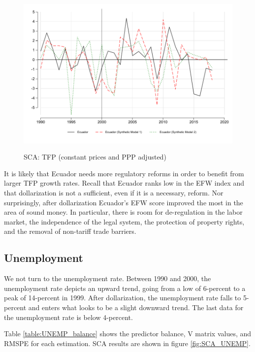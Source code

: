 \documentclass[12pt]{article}
\begin{document}


\begin{figure}[!htbp]
    \caption{SCA: TFP (constant prices and PPP adjusted)}
    \centering
    \includegraphics{STATA/Fig_TFP3_SCA.pdf}
    \label{fig:SCA_TFP}
\end{figure}

It is likely that Ecuador needs more regulatory reforms in order to benefit from larger TFP growth rates. Recall that Ecuador ranks low in the EFW index and that dollarization is not a sufficient, even if it is a necessary, reform. Nor surprisingly, after dollarization Ecuador's EFW score improved the most in the area of sound money. In particular, there is room for de-regulation in the labor market, the independence of the legal system, the protection of property rights, and the removal of non-tariff trade barriers.

\subsection{Unemployment}

We not turn to the unemployment rate. Between 1990 and 2000, the unemployment rate depicts an upward trend, going from a low of 6-percent to a peak of 14-percent in 1999. After dollarization, the unemployment rate falls to 5-percent and enters what looks to be a slight downward trend. The last data for the unemployment rate is below 4-percent. 

Table \ref{table:UNEMP_balance} shows the predictor balance, V matrix values, and RMSPE for each estimation. SCA results are shown in figure \ref{fig:SCA_UNEMP}.


\end{document}
